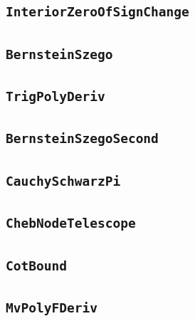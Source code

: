 \documentclass[11pt]{amsart}
\theoremstyle{definition}
\begin{document}
\subsection{\texorpdfstring{\texttt{InteriorZeroOfSignChange}}{InteriorZeroOfSignChange}}\label{node:InteriorZeroOfSignChange}


\subsection{\texorpdfstring{\texttt{BernsteinSzego}}{BernsteinSzego}}\label{node:BernsteinSzego}


\subsection{\texorpdfstring{\texttt{TrigPolyDeriv}}{TrigPolyDeriv}}\label{node:TrigPolyDeriv}


\subsection{\texorpdfstring{\texttt{BernsteinSzegoSecond}}{BernsteinSzegoSecond}}\label{node:BernsteinSzegoSecond}


\subsection{\texorpdfstring{\texttt{CauchySchwarzPi}}{CauchySchwarzPi}}\label{node:CauchySchwarzPi}


\subsection{\texorpdfstring{\texttt{ChebNodeTelescope}}{ChebNodeTelescope}}\label{node:ChebNodeTelescope}


\subsection{\texorpdfstring{\texttt{CotBound}}{CotBound}}\label{node:CotBound}


\subsection{\texorpdfstring{\texttt{MvPolyFDeriv}}{MvPolyFDeriv}}\label{node:MvPolyFDeriv}

\end{document}
